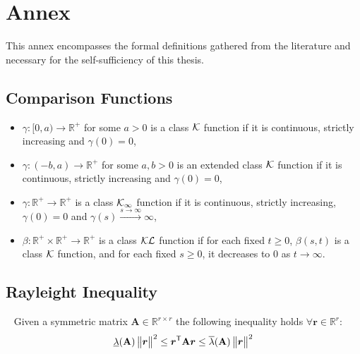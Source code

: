 \chapter{Annex}\label{annex}
This annex encompasses the formal definitions gathered from the literature and necessary for the self-sufficiency of this thesis.
\section{Comparison Functions}
\begin{definition}\label{def:comparison functions}
	\cite[Definitions~4.2--4.3]{khalil2002NonLinearSystems}
	\begin{itemize}
		\item $\gamma:[0,a)\rightarrow \mathbb{R}^+$ for some $a>0$ is a class $\cal K$  function if it is continuous, strictly increasing and $\gamma(0)=0$,
		\item $\gamma:(-b,a)\rightarrow \mathbb{R}^+$ for some $a,b>0$ is an extended class $\cal K$  function if it is continuous, strictly increasing and $\gamma(0)=0$,
		\item $\gamma:\mathbb{R}^+\rightarrow \mathbb{R}^+$ is a class $\cal K_\infty$  function if it is continuous, strictly increasing, $\gamma(0)=0$ and $\gamma(s)\overset{s \rightarrow\infty}{\longrightarrow} \infty$,
		\item $\beta:\mathbb{R}^{+}\times\mathbb{R}^{+}\rightarrow \mathbb{R}^{+}$ is a class $\cal KL$  function if for each fixed $t \geq0$, $\beta(s,t)$ is a class $\cal K$ function, and for each fixed $s \geq0$, it  decreases to $0$ as $t \rightarrow\infty$.
	\end{itemize}
\end{definition}
\section{Rayleight Inequality}\label{app:rayghleight}
\begin{definition}
	~\cite{rugh1996LinearSystemTheory}
	Given a symmetric matrix $\mathbf{A}\in\mathbb{R}^{r\times r}$ the following inequality  holds $\forall \bm{r}\in\mathbb{R}^r$:
	\begin{equation}\label{eq:rayleight-ritz inequality}
		\underline{\lambda}(\mathbf{A})\begin{Vmatrix} \bm{r} \end{Vmatrix}^2\leq \bm{r}^{\mathsf{T}}\mathbf{A}\bm{r}\leq\overline{\lambda}(\mathbf{A})\begin{Vmatrix} \bm{r} \end{Vmatrix}^2 
	\end{equation}
\end{definition}
